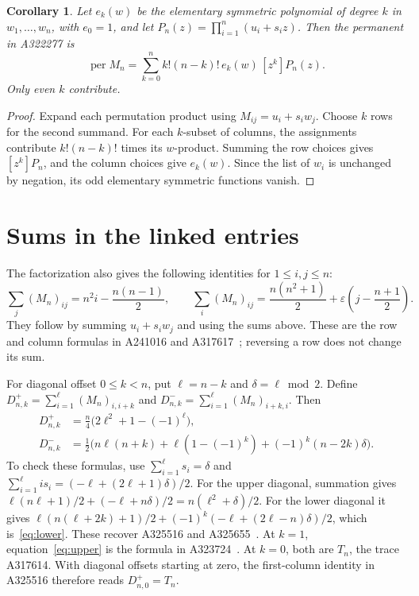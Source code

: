 \documentclass[11pt]{article}
\newtheorem{corollary}[theorem]{Corollary}
\newcommand{\eps}{\varepsilon}
\begin{document}
\begin{corollary}\label{cor:permanent}
Let $e_k(w)$ be the elementary symmetric polynomial of degree $k$ in
$w_1,\ldots,w_n$, with $e_0=1$, and let
$P_n(z)=\prod_{i=1}^n(u_i+s_i z)$. Then the permanent in A322277 is
\[
\operatorname{per}M_n=
\sum_{k=0}^n k!(n-k)!\,e_k(w)\,[z^k]P_n(z).
\]
Only even $k$ contribute.
\end{corollary}
\begin{proof}
Expand each permutation product using $M_{ij}=u_i+s_iw_j$.
Choose $k$ rows for the second summand. For each $k$-subset of columns,
the assignments contribute $k!(n-k)!$ times its $w$-product.
Summing the row choices gives $[z^k]P_n$, and the column choices give
$e_k(w)$. Since the list of $w_i$ is unchanged by negation, its odd
elementary symmetric functions vanish.
\end{proof}

\section{Sums in the linked entries}
The factorization also gives the following identities for $1\leq i,j\leq n$:
\begin{equation}\label{eq:rowcol}
\sum_j(M_n)_{ij}=n^2i-\frac{n(n-1)}2,\qquad
\sum_i(M_n)_{ij}=\frac{n(n^2+1)}2+
\eps\left(j-\frac{n+1}{2}\right).
\end{equation}
They follow by summing $u_i+s_iw_j$ and using the sums above.
These are the row and column formulas in A241016 and
A317617~\cite{s241016,s317617}; reversing a row does not change its sum.

For diagonal offset $0\leq k<n$, put $\ell=n-k$ and
$\delta=\ell\bmod2$. Define
$D^+_{n,k}=\sum_{i=1}^{\ell}(M_n)_{i,i+k}$ and
$D^-_{n,k}=\sum_{i=1}^{\ell}(M_n)_{i+k,i}$. Then
\begin{align}
D^+_{n,k}&=\frac n4\bigl(2\ell^2+1-(-1)^\ell\bigr),\label{eq:upper}\\
D^-_{n,k}&=\frac12\bigl(n\ell(n+k)+\ell(1-(-1)^k)
                   +(-1)^k(n-2k)\delta\bigr).\label{eq:lower}
\end{align}
To check these formulas, use
$\sum_{i=1}^\ell s_i=\delta$ and
$\sum_{i=1}^\ell i s_i=(-\ell+(2\ell+1)\delta)/2$.
For the upper diagonal, summation gives
$\ell(n\ell+1)/2+(-\ell+n\delta)/2
=n(\ell^2+\delta)/2$.
For the lower diagonal it gives
$\ell(n(\ell+2k)+1)/2+
(-1)^k(-\ell+(2\ell-n)\delta)/2$,
which is~\eqref{eq:lower}.
These recover A325516 and A325655~\cite{s325516,s325655}.
At $k=1$, equation~\eqref{eq:upper} is the formula in
A323724~\cite{s323724}. At $k=0$, both are $T_n$, the trace A317614.
With diagonal offsets starting at zero, the first-column identity in
A325516 therefore reads $D^+_{n,0}=T_n$.
\end{document}
